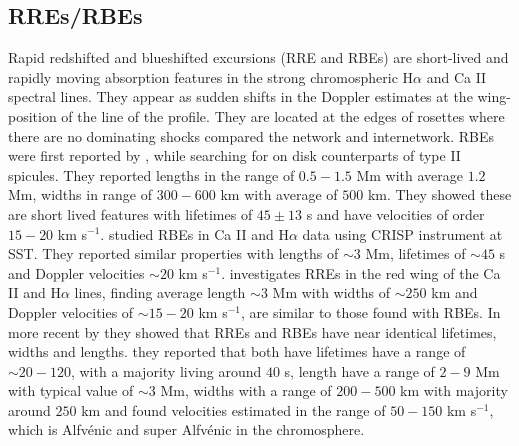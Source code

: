 \documentclass[12pt]{ociamthesis}
\newcommand{\Alfvenic}{Alfv\'{e}nic }
\begin{document}
\subsection{RREs/RBEs}
\label{subsec:rbe}
Rapid redshifted and blueshifted excursions (RRE and RBEs) are short-lived and rapidly moving absorption features in the strong chromospheric H$\alpha$ and Ca II spectral lines. They appear as sudden shifts in the Doppler estimates at the wing-position of the line of the profile. They are located at the edges of rosettes where there are no dominating shocks compared the network and internetwork. RBEs were first reported by \cite{Langangen2008ApJ}, while searching for on disk counterparts of type II spicules. They reported lengths in the range of $0.5-1.5$ Mm with average $1.2$ Mm, widths in range of $300-600$ km with average of $500$ km. They showed these are short lived features with lifetimes of $45\pm13$ s and have velocities of order $15-20$ km s$^{-1}$.\cite{Rouppe2009ApJ} studied RBEs in Ca II and H$\alpha$ data using CRISP instrument at SST. They reported similar properties with lengths of $\sim 3$ Mm, lifetimes of $\sim 45$ s and Doppler velocities $\sim 20$ km s$^{-1}$. \cite{Sekse2013ApJ76944S,Sekse2013ApJ764164S} investigates RREs in the red wing of the  Ca II and H$\alpha$ lines, finding average length $\sim 3$ Mm with widths of $\sim 250$ km and Doppler velocities of $\sim 15-20$ km s$^{-1}$, are similar to those found with RBEs.  In more recent by \cite{Kuridze2015ApJ80226K} they showed that RREs and RBEs have near identical lifetimes, widths and lengths. they reported that both have lifetimes have a range of $\sim 20-120$, with a majority living around $40$ s, length have a range of $2-9$ Mm with typical value of $\sim 3$ Mm, widths with a range of $200-500$ km with majority around $250$ km and found velocities estimated in the range of $50-150$ km s$^{-1}$, which is \Alfvenic and super \Alfvenic in the chromosphere. \\
\end{document}
